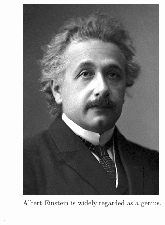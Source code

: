 \begin{figure}[t]
	\centering
	\includegraphics[width=0.5\columnwidth,trim={0cm 0.0cm 0cm 0.0cm}]{Images/Einstein.png}
	\caption{\small Albert Einstein is widely regarded as a genius.}
	\label{fig:queue-length}
\end{figure}



\cite{Tsebook05,SamarakoonTWC13,KeyInforcom2007}.